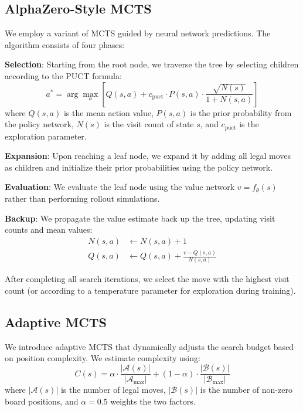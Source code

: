 \documentclass{article}
\begin{document}
\subsection{AlphaZero-Style MCTS}

We employ a variant of MCTS guided by neural network predictions. The algorithm consists of four phases:

\textbf{Selection}: Starting from the root node, we traverse the tree by selecting children according to the PUCT formula:
\begin{equation}
a^* = \arg\max_a \left[ Q(s,a) + c_{\text{puct}} \cdot P(s,a) \cdot \frac{\sqrt{N(s)}}{1 + N(s,a)} \right]
\end{equation}
where $Q(s,a)$ is the mean action value, $P(s,a)$ is the prior probability from the policy network, $N(s)$ is the visit count of state $s$, and $c_{\text{puct}}$ is the exploration parameter.

\textbf{Expansion}: Upon reaching a leaf node, we expand it by adding all legal moves as children and initialize their prior probabilities using the policy network.

\textbf{Evaluation}: We evaluate the leaf node using the value network $v = f_\theta(s)$ rather than performing rollout simulations.

\textbf{Backup}: We propagate the value estimate back up the tree, updating visit counts and mean values:
\begin{align}
N(s,a) &\leftarrow N(s,a) + 1 \\
Q(s,a) &\leftarrow Q(s,a) + \frac{v - Q(s,a)}{N(s,a)}
\end{align}

After completing all search iterations, we select the move with the highest visit count (or according to a temperature parameter for exploration during training).

\subsection{Adaptive MCTS}

We introduce adaptive MCTS that dynamically adjusts the search budget based on position complexity. We estimate complexity using:
\begin{equation}
C(s) = \alpha \cdot \frac{|\mathcal{A}(s)|}{|\mathcal{A}_{\max}|} + (1-\alpha) \cdot \frac{|\mathcal{B}(s)|}{|\mathcal{B}_{\max}|}
\end{equation}
where $|\mathcal{A}(s)|$ is the number of legal moves, $|\mathcal{B}(s)|$ is the number of non-zero board positions, and $\alpha=0.5$ weights the two factors.
\end{document}
